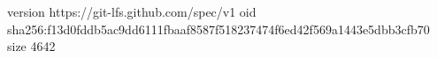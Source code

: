 version https://git-lfs.github.com/spec/v1
oid sha256:f13d0fddb5ac9dd6111fbaaf8587f518237474f6ed42f569a1443e5dbb3cfb70
size 4642
